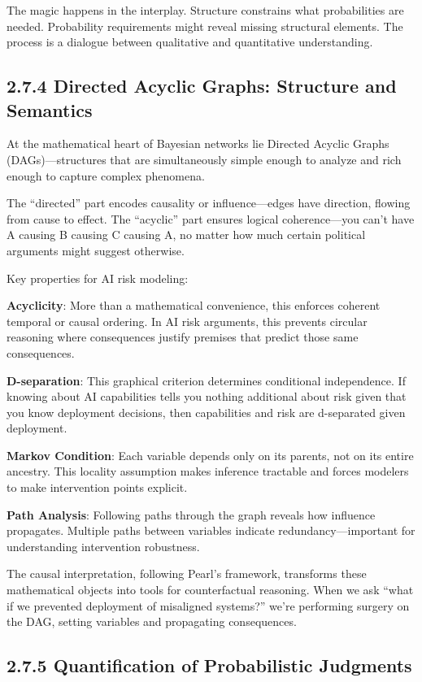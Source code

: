 \documentclass[
  11pt,
  letterpaper,
]{book}
\begin{document}
The magic happens in the interplay. Structure constrains what
probabilities are needed. Probability requirements might reveal missing
structural elements. The process is a dialogue between qualitative and
quantitative understanding.

\subsection{2.7.4 Directed Acyclic Graphs: Structure and
Semantics}\label{sec-dag-structure}

At the mathematical heart of Bayesian networks lie Directed Acyclic
Graphs (DAGs)---structures that are simultaneously simple enough to
analyze and rich enough to capture complex phenomena.

The ``directed'' part encodes causality or influence---edges have
direction, flowing from cause to effect. The ``acyclic'' part ensures
logical coherence---you can't have A causing B causing C causing A, no
matter how much certain political arguments might suggest otherwise.

Key properties for AI risk modeling:

\textbf{Acyclicity}: More than a mathematical convenience, this enforces
coherent temporal or causal ordering. In AI risk arguments, this
prevents circular reasoning where consequences justify premises that
predict those same consequences.

\textbf{D-separation}: This graphical criterion determines conditional
independence. If knowing about AI capabilities tells you nothing
additional about risk given that you know deployment decisions, then
capabilities and risk are d-separated given deployment.

\textbf{Markov Condition}: Each variable depends only on its parents,
not on its entire ancestry. This locality assumption makes inference
tractable and forces modelers to make intervention points explicit.

\textbf{Path Analysis}: Following paths through the graph reveals how
influence propagates. Multiple paths between variables indicate
redundancy---important for understanding intervention robustness.

The causal interpretation, following Pearl's framework, transforms these
mathematical objects into tools for counterfactual reasoning. When we
ask ``what if we prevented deployment of misaligned systems?'' we're
performing surgery on the DAG, setting variables and propagating
consequences.

\subsection{2.7.5 Quantification of Probabilistic
Judgments}\label{sec-quantification}
\end{document}
